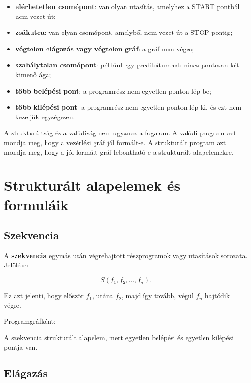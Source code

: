\begin{itemize}
  \item \textbf{elérhetetlen csomópont}: van olyan utasítás, amelyhez a START pontból nem vezet út;
  \item \textbf{zsákutca}: van olyan csomópont, amelyből nem vezet út a STOP pontig;
  \item \textbf{végtelen elágazás vagy végtelen gráf}: a gráf nem véges;
  \item \textbf{szabálytalan csomópont}: például egy predikátumnak nincs pontosan két kimenő ága;
  \item \textbf{több belépési pont}: a programrész nem egyetlen ponton lép be;
  \item \textbf{több kilépési pont}: a programrész nem egyetlen ponton lép ki, és ezt nem kezeljük egységesen.
\end{itemize}

\begin{warningbox}
A strukturáltság és a valódiság nem ugyanaz a fogalom. A valódi program azt mondja meg, hogy a vezérlési gráf jól formált-e. A strukturált program azt mondja meg, hogy a jól formált gráf lebontható-e a strukturált alapelemekre.
\end{warningbox}

\section{Strukturált alapelemek és formuláik}

\subsection{Szekvencia}

A \textbf{szekvencia} egymás után végrehajtott részprogramok vagy utasítások sorozata. Jelölése:

\[
S(f_1,f_2,\ldots,f_n).
\]

Ez azt jelenti, hogy először $f_1$, utána $f_2$, majd így tovább, végül $f_n$ hajtódik végre.


Programgráfként:



A szekvencia strukturált alapelem, mert egyetlen belépési és egyetlen kilépési pontja van.

\subsection{Elágazás}


